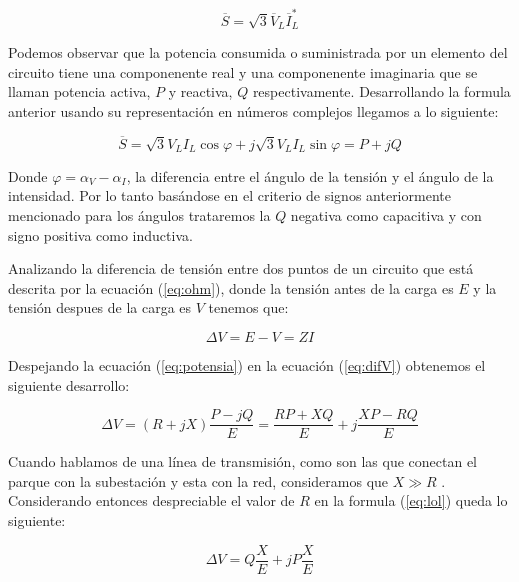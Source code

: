 \documentclass{book}
\begin{document}
\begin{equation}
	\overline{S}=\sqrt{3} \overline{V}_L  \overline{I}_L^*
\end{equation} \par

Podemos observar que la potencia consumida o suministrada por un elemento del circuito tiene una componenente real y una componenente imaginaria que se llaman potencia activa, $P$ y reactiva, $Q$ respectivamente. Desarrollando la formula anterior usando su representaci\'on en n\'umeros complejos llegamos a lo siguiente: \par

\begin{equation}\label{eq:potensia}
	\overline{S}= \sqrt{3} V_L I_L \cos{\varphi}+j\sqrt{3} V_L I_L \sin{\varphi} = P+jQ 
\end{equation} \par

Donde $\varphi= \alpha_V-\alpha_I$, la diferencia entre el \'angulo de la tensi\'on y el \'angulo de la intensidad. Por lo tanto bas\'andose en el criterio de signos anteriormente mencionado para los \'angulos trataremos la $Q$ negativa como capacitiva y con signo positiva como inductiva. \par

Analizando la diferencia de tensi\'on entre dos puntos de un circuito que est\'a descrita por la ecuaci\'on (\ref{eq:ohm}), donde la tensi\'on antes de la carga es $E$ y la tensi\'on despues de la carga es $V$ tenemos que:

\begin{equation}\label{eq:difV}
	\Delta V=E-V=ZI
\end{equation} \par

 Despejando la ecuaci\'on (\ref{eq:potensia}) en la ecuaci\'on (\ref{eq:difV}) obtenemos el siguiente desarrollo:

\begin{equation}\label{eq:lol}
	\Delta V=(R+jX)\frac{P-jQ}{E}= \frac{RP+XQ}{E}+j\frac{XP-RQ}{E}
\end{equation} \par

Cuando hablamos de una l\'inea de transmisi\'on, como son las que conectan el parque con la subestaci\'on y esta con la red, consideramos que $X \gg R$ \cite{WFgridcode}. Considerando entonces despreciable el valor de $R$ en la formula (\ref{eq:lol}) queda lo siguiente: 

\begin{equation}
	\Delta V= Q\frac{X}{E}+jP\frac{X}{E}
\end{equation} \par
\end{document}
